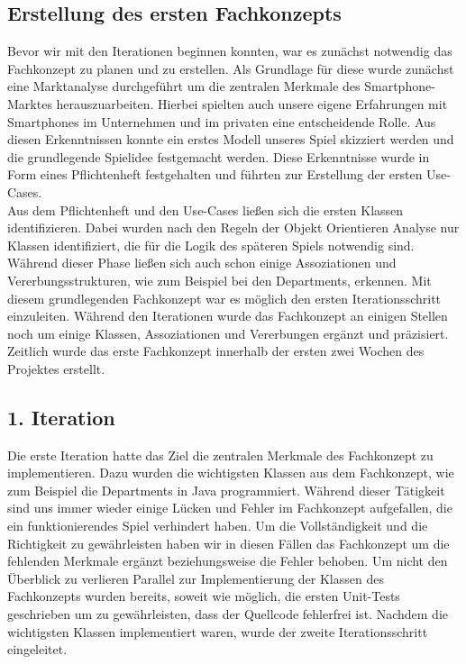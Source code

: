 \subsection{Erstellung des ersten Fachkonzepts}
Bevor wir mit den Iterationen beginnen konnten, war es zunächst notwendig das Fachkonzept zu planen und zu erstellen. Als Grundlage für diese wurde zunächst eine Marktanalyse durchgeführt um die zentralen Merkmale des Smartphone-Marktes herauszuarbeiten. Hierbei spielten auch unsere eigene Erfahrungen mit Smartphones im Unternehmen und im privaten eine entscheidende Rolle. Aus diesen Erkenntnissen konnte ein erstes Modell unseres Spiel skizziert werden und die grundlegende Spielidee festgemacht werden. Diese Erkenntnisse wurde in Form eines Pflichtenheft festgehalten und führten zur Erstellung der ersten Use-Cases. \\
Aus dem Pflichtenheft und den Use-Cases ließen sich die ersten Klassen identifizieren. Dabei wurden nach den Regeln der Objekt Orientieren Analyse nur Klassen identifiziert, die für die Logik des späteren Spiels notwendig sind. Während dieser Phase ließen sich auch schon einige Assoziationen und Vererbungsstrukturen, wie zum Beispiel bei den Departments, erkennen. Mit diesem grundlegenden Fachkonzept war es möglich den ersten Iterationsschritt einzuleiten. Während den Iterationen wurde das Fachkonzept an einigen Stellen noch um einige Klassen, Assoziationen und Vererbungen ergänzt und präzisiert.\\
Zeitlich wurde das erste Fachkonzept innerhalb der ersten zwei Wochen des Projektes erstellt.


\subsection{1. Iteration}
Die erste Iteration hatte das Ziel die zentralen Merkmale des Fachkonzept zu implementieren. Dazu wurden die wichtigsten Klassen aus dem Fachkonzept, wie zum Beispiel die Departments in Java programmiert. Während dieser Tätigkeit sind uns immer wieder einige Lücken und Fehler im Fachkonzept aufgefallen, die ein funktionierendes Spiel verhindert haben. Um die Vollständigkeit und die Richtigkeit zu gewährleisten haben wir in diesen Fällen das Fachkonzept um die fehlenden Merkmale ergänzt beziehungsweise die Fehler behoben. Um nicht den Überblick zu verlieren Parallel zur Implementierung der Klassen des Fachkonzepts wurden bereits, soweit wie möglich, die ersten Unit-Tests geschrieben um zu gewährleisten, dass der Quellcode fehlerfrei ist. Nachdem die wichtigsten Klassen implementiert waren, wurde der zweite Iterationsschritt eingeleitet.

